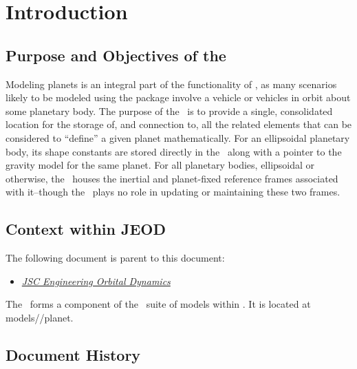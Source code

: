 \setcounter{chapter}{0}

\chapter{Introduction}\label{ch:intro}

\section{Purpose and Objectives of the \planetDesc}

Modeling planets is an integral part of the functionality of \JEODid, as
many scenarios likely to be modeled using the package involve
a vehicle or vehicles in orbit about some planetary body. The purpose of 
the \planetDesc\ is to provide a single, consolidated location for the 
storage of, and connection to, all the related elements that can be 
considered to ``define'' a given planet mathematically.
For an ellipsoidal planetary body, its shape constants are stored directly
in the \planetDesc\, along with a pointer to the gravity model for the 
same planet.  For all planetary bodies, ellipsoidal or otherwise,
the \planetDesc\ houses the inertial and planet-fixed reference frames
associated with it--though the \planetDesc\ plays no role in updating
or maintaining these two frames.


\section{Context within JEOD}
The following document is parent to this document:
\begin{itemize}
\item{\href{file:\JEODHOME/docs/JEOD.pdf}
           {\em JSC Engineering Orbital Dynamics}}
                          \cite{dynenv:JEOD}
\end{itemize}

The \planetDesc\ forms a component of the \ModelClass\ suite of
models within \JEODid. It is located at
models/\ModelClass/planet.


\section{Document History}

